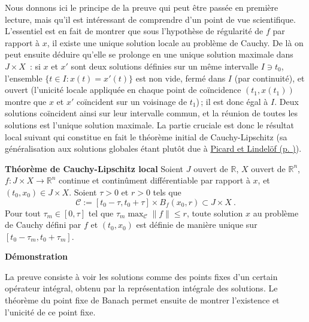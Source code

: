 \hypertarget{duxe9monstration-4}{}
\begin{preuve}\label{duxe9monstration-4}
Nous donnons ici le principe de la preuve qui peut être passée en
première lecture, mais qu'il est intéressant de comprendre d'un point de
vue scientifique. L'essentiel est en fait de montrer que sous
l'hypothèse de régularité de \(f\) par rapport à \(x\), il existe une
unique solution locale au problème de Cauchy. De là on peut ensuite
déduire qu'elle se prolonge en une unique solution maximale dans
\(J\times X\)~: si \(x\) et \(x'\) sont deux solutions définies sur un
même intervalle \(I\ni t_0\), l'ensemble \(\{t\in I : x(t)=x'(t)\}\) est
non vide, fermé dans \(I\) (par continuité), et ouvert (l'unicité locale
appliquée en chaque point de coïncidence \((t_1,x(t_1))\) montre que
\(x\) et \(x'\) coïncident sur un voisinage de \(t_1\))\,; il est donc
égal à \(I\). Deux solutions coïncident ainsi sur leur intervalle commun,
et la réunion de toutes les solutions est l'unique solution maximale. La
partie cruciale est donc le résultat local suivant qui
constitue en fait le théorème initial de Cauchy-Lipschitz (sa
généralisation aux solutions globales étant plutôt due à
\protect\hyperlink{rem_approx_succ}{Picard et Lindelöf (p.
\pageref*{rem_approx_succ})}).

\textbf{Théorème de Cauchy-Lipschitz local} Soient \(J\) ouvert de
\(\mathbb{R}\), \(X\) ouvert de \(\mathbb{R}^{n}\),
\(f: J\times X \to \mathbb{R}^n\) continue et continûment différentiable
par rapport à \(x\), et \((t_0,x_0)\in J\times X\). Soient \(\tau>0\) et
\(r>0\) tels que \[
\mathcal{C}:=\left[t_0-\tau,t_0+\tau \right]\times B_f(x_0,r)\subset J\times X \ .
\] Pour tout \(\tau_m\in \left[0,\tau \right]\) tel que
\(\tau_m \max_{\mathcal{C}} \|f\| \leq r\), toute solution \(x\) au
problème de Cauchy défini par \(f\) et \((t_0,x_0)\) est définie de
manière unique sur \([t_0-\tau_m,t_0+\tau_m]\).

\textbf{Démonstration}

La preuve consiste à voir les solutions comme des points fixes d'un
certain opérateur intégral, obtenu par la représentation intégrale des
solutions. Le théorème du point fixe de Banach permet ensuite de montrer
l'existence et l'unicité de ce point fixe.


\end{preuve}
